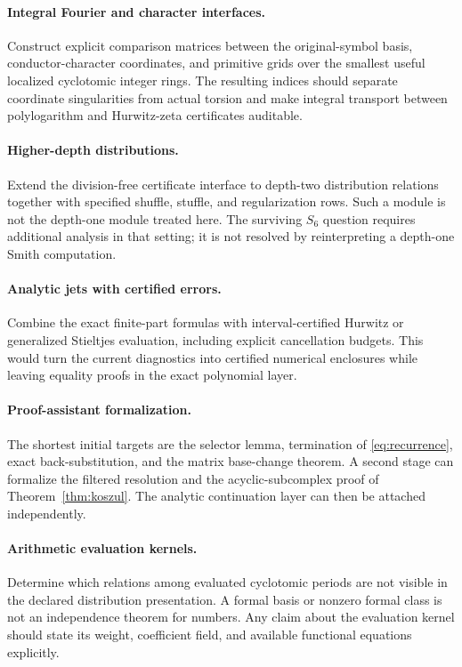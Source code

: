 \documentclass[11pt]{article}
\numberwithin{equation}{section}
\theoremstyle{definition}
\theoremstyle{remark}
\begin{document}
\paragraph{Integral Fourier and character interfaces.}
Construct explicit comparison matrices between the original-symbol
basis, conductor-character coordinates, and primitive grids over the
smallest useful localized cyclotomic integer rings. The resulting
indices should separate coordinate singularities from actual torsion
and make integral transport between polylogarithm and Hurwitz-zeta
certificates auditable.

\paragraph{Higher-depth distributions.}
Extend the division-free certificate interface to depth-two distribution
relations together with specified shuffle, stuffle, and regularization
rows. Such a module is not the depth-one module treated here. The
surviving $S_6$ question requires additional analysis in that setting;
it is not resolved by reinterpreting a depth-one Smith computation.

\paragraph{Analytic jets with certified errors.}
Combine the exact finite-part formulas with interval-certified Hurwitz
or generalized Stieltjes evaluation, including explicit cancellation
budgets. This would turn the current diagnostics into certified
numerical enclosures while leaving equality proofs in the exact
polynomial layer.

\paragraph{Proof-assistant formalization.}
The shortest initial targets are the selector lemma, termination of
\eqref{eq:recurrence}, exact back-substitution, and the matrix
base-change theorem. A second stage can formalize the filtered
resolution and the acyclic-subcomplex proof of
Theorem~\ref{thm:koszul}. The analytic continuation layer can then be
attached independently.

\paragraph{Arithmetic evaluation kernels.}
Determine which relations among evaluated cyclotomic periods are not
visible in the declared distribution presentation. A formal basis or
nonzero formal class is not an independence theorem for numbers. Any
claim about the evaluation kernel should state its weight, coefficient
field, and available functional equations explicitly.
\end{document}
